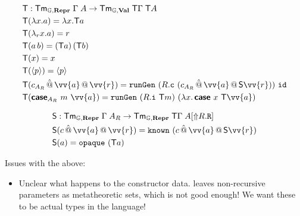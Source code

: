 \begin{align*}
   & \fun T            : \Tm_{\catG, \mR} \; {\Gamma} \; A \to \Tm_{\catG, \mV}\; {\fun T \Gamma} \; \fun T A                                               \\
   & \fun T(\lambda x . a)  = \lambda x . \fun T a                                                                                                          \\
   & \fun T(\lambda_r x . a)  = r                                                                                                                           \\
   & \fun T(a \, b)  = (\fun T a) \, (\fun T b)                                                                                                             \\
   & \fun T(x) = x                                                                                                                                          \\
   & \fun T(\quot {p}) = \quot {p}                                                                                                                          \\
   & \fun T(c_{A_R} \, \hat{@} \, \vv{a} \,@\, \vv{r}) =  \defin{runGen} \ (R.\defin{c} \ (c_{A_R} \, \hat{@} \, \vv{a} \,@\, \fun S \vv{r})) \  \defin{id} \\
   & \fun T(\inte{case}_{A_R}\ m\ \vv{a}) =  \defin{runGen} \ (R.\defin{i} \ \fun T m) \  (\lambda x.\, \inte{case}\ x \ \fun T\vv{a})                      \\
\end{align*}

\begin{align*}
   & \fun S            : \Tm_{\catG, \mR} \; {\Gamma} \; A_R \to \Tm_{\catG,\mR}\; {\fun T \Gamma} \; A[\lift{R.\defin{R}}] \\
   & \fun S(c \, \hat{@} \, \vv{a} \,@\, \vv{r}) = \defin{known}\ (c \, \hat{@} \, \vv{a} \,@\, \fun S\vv{r})               \\
   & \fun S(a)  = \defin{opaque}\ (\fun T a)
\end{align*}

Issues with the above:

\begin{itemize}
  \item Unclear what happens to the constructor data. \cite{Kaposi2020-is} leaves
        non-recursive parameters as metatheoretic sets, which is not good enough! We
        want these to be actual types in the language!
\end{itemize}

